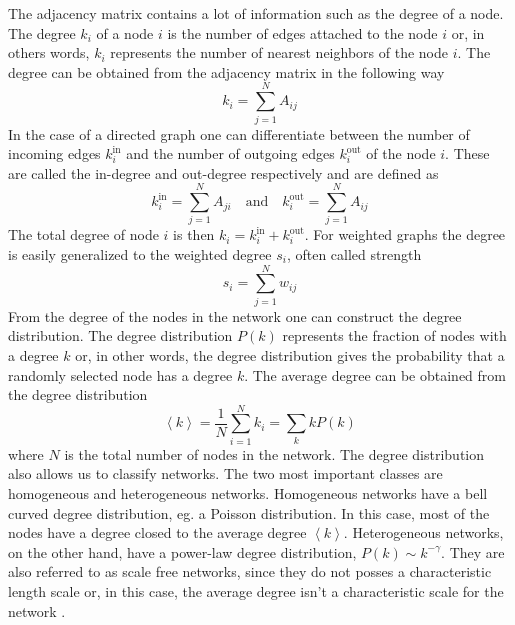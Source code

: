 \documentclass[11 pt , letterpaper , twoside , openright]{book}
\begin{document}
The adjacency matrix contains a lot of information such as the degree of a node. The degree $k_i$ of a node $i$ is the number of edges attached to the node $i$ or, in others words, $k_i$ represents the number of nearest neighbors of the node $i$. The degree can be obtained from the adjacency matrix in the following way \cite{Mata2020}
\begin{equation}
	k_i = \sum_{j=1}^N A_{ij}
\end{equation}
In the case of a directed graph one can differentiate between the number of incoming edges $k_i^{\text{in}}$ and the number of outgoing edges $k_i^{\text{out}}$ of the node $i$. These are called the in-degree and out-degree respectively and are defined as \cite{Mata2020}
\begin{equation}
	k_i^{\text{in}} = \sum_{j=1}^N A_{ji} \quad \text{and} \quad k_i^{\text{out}} = \sum_{j=1}^N A_{ij}
\end{equation}
The total degree of node $i$ is then $k_i = k_i^{\text{in}} + k_i^{\text{out}}$. For weighted graphs the degree is easily generalized to the weighted degree $s_i$, often called strength \cite{Ioannis2007}
\begin{equation}
	s_i = \sum_{j=1}^N w_{ij}
\end{equation}
From the degree of the nodes in the network one can construct the degree distribution. The degree distribution $P(k)$ represents the fraction of nodes with a degree $k$ or, in other words, the degree distribution gives the probability that a randomly selected node has a degree $k$. The average degree can be obtained from the degree distribution \cite{Mata2020}
\begin{equation}
	\left<k\right> = \frac{1}{N} \sum_{i=1}^N k_i = \sum_k k P(k)
\end{equation}
where $N$ is the total number of nodes in the network. The degree distribution also allows us to classify networks. The two most important classes are homogeneous and heterogeneous networks. Homogeneous networks have a bell curved degree distribution, eg. a Poisson distribution. In this case, most of the nodes have a degree closed to the average degree $\left<k\right>$. Heterogeneous networks, on the other hand, have a power-law degree distribution, $P(k) \sim k^{-\gamma}$. %
They are also referred to as scale free networks, since they do not posses a characteristic length scale or, in this case, the average degree isn't a characteristic scale for the network \cite{Mata2020}. %
\end{document}
